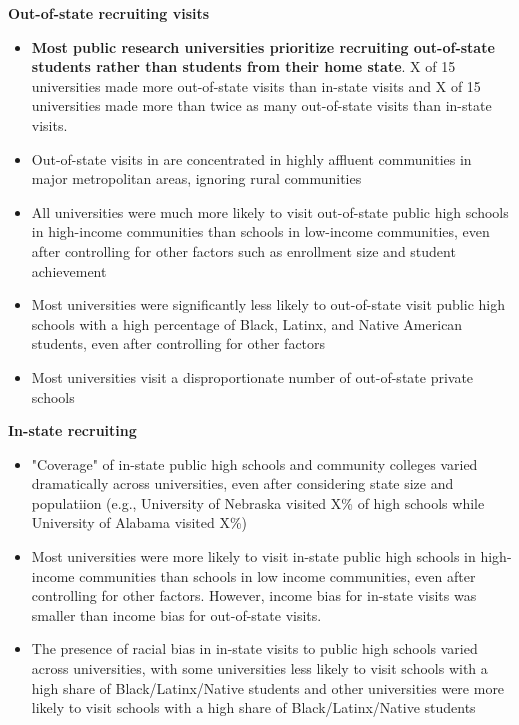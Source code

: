 \documentclass[twoside]{article}
\begin{document}
\begin{color-block}[Findings]

\textbf{Out-of-state recruiting visits}
\begin{itemize}
    \item \textbf{Most public research universities prioritize recruiting out-of-state students rather than students from their home state}. X of 15 universities made more out-of-state visits than in-state visits and X of 15 universities made more than twice as many out-of-state visits than in-state visits.
    \item Out-of-state visits in are concentrated in highly affluent communities in major metropolitan areas, ignoring rural communities
    \item All universities were much more likely to visit out-of-state public high schools in high-income communities than schools in low-income communities, even after controlling for other factors such as enrollment size and student achievement
    \item Most universities were significantly less likely to out-of-state visit public high schools with a high percentage of Black, Latinx, and Native American students, even after controlling for other factors
    \item Most universities visit a disproportionate number of out-of-state private schools
\end{itemize}

\textbf{In-state recruiting}
\begin{itemize}
    \item "Coverage" of in-state public high schools and community colleges varied dramatically across universities, even after considering state size and populatiion (e.g., University of Nebraska visited X\% of high schools while University of Alabama visited X\%)
    \item Most universities were more likely to visit in-state public high schools in high-income communities than schools in low income communities, even after controlling for other factors. However, income bias for in-state visits was smaller than income bias for out-of-state visits.
    \item The presence of racial bias in in-state visits to public high schools varied across universities, with some universities less likely to visit schools with a high share of Black/Latinx/Native students and other universities were more likely to visit schools with a high share of Black/Latinx/Native students
\end{itemize}  


\end{color-block}
\end{document}
